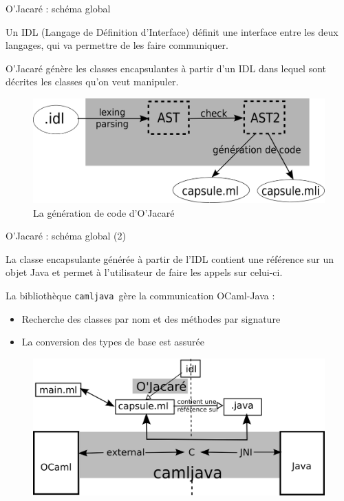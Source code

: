 \documentclass[xcolor={table,dvipsnames}]{beamer}
\newcommand{\camljava}{{\tt{camljava}}}
\begin{document}
\begin{frame}{O'Jacaré : schéma global }

\begin{definition}
Un \alert{IDL} (Langage de Définition d'Interface) définit une interface entre les deux langages, qui va permettre de les faire communiquer.
\end{definition}

O'Jacaré génère les classes encapsulantes à partir d'un IDL dans lequel sont décrites les classes qu'on veut manipuler.
\medskip
\begin{figure}[h]
  \centering
  \includegraphics[scale=0.9]{schemaOjacare.png}
  \caption{La génération de code d'O'Jacaré}
\end{figure}

\end{frame}


\begin{frame}{O'Jacaré : schéma global (2) }
  \begin{definition}
    La \alert{classe encapsulante} générée à partir de l'IDL contient une référence sur un objet Java et permet à l'utilisateur de faire les appels sur celui-ci.
  \end{definition}
La bibliothèque \camljava \ gère la communication OCaml-Java :
\begin{itemize}
\item Recherche des classes par nom et des méthodes par signature
\item La conversion des types de base est assurée
\end{itemize}
\begin{figure}[h!]
  \centering
  \includegraphics[scale=0.8]{schemaCamljava2.png}
\end{figure}

\end{frame}
\end{document}
